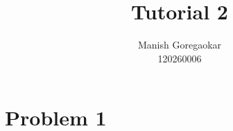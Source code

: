 \documentclass[12pt]{article}
\author{Manish Goregaokar\\120260006}
\title{Tutorial 2}
\begin{document}
\maketitle

\section*{Problem 1}
\end{document}
